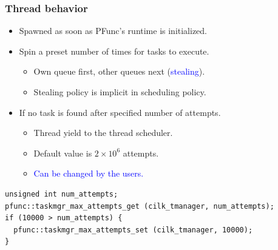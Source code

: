 \documentclass{beamer}
\newcommand{\tablefont}{\fontsize{8}{13}\selectfont}
\begin{document}
\begin{frame}[fragile]
\frametitle{Thread behavior}
\begin{itemize}
\item Spawned as soon as PFunc's runtime is initialized.
\item Spin a preset number of times for tasks to execute.
  \begin{itemize}
  \item Own queue first, other queues next (\textcolor{blue}{stealing}).
  \item Stealing policy is implicit in scheduling policy.
  \end{itemize}
\item If no task is found after specified number of attempts. 
  \begin{itemize}
  \item Thread yield to the thread scheduler.
  \item Default value is $2\times{}10^6$ attempts.
  \item \textcolor{blue}{Can be changed by the users.}
  \end{itemize}
\end{itemize}
\begin{center}
\begin{minipage}{0.70\textwidth}
\begin{lstlisting}[basicstyle=\tablefont]
unsigned int num_attempts;
pfunc::taskmgr_max_attempts_get (cilk_tmanager, num_attempts);
if (10000 > num_attempts) {
  pfunc::taskmgr_max_attempts_set (cilk_tmanager, 10000);
}
\end{lstlisting}
\end{minipage}
\end{center}
\end{frame}
\end{document}
